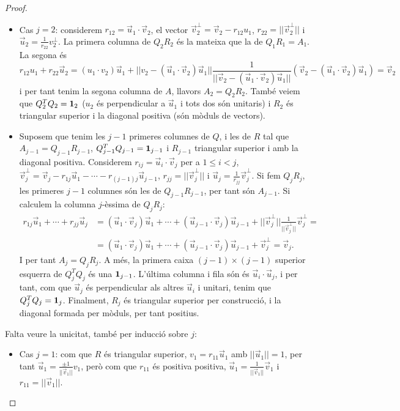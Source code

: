 \begin{proof}
\begin{itemize}
    \item Cas $j=2$: considerem $r_{12}=\vec u_1\cdot \vec v_2$, el vector $\vec v_2^\perp=\vec v_2-r_{12}u_1$, $r_{22}=||\vec v_2^\perp||$ i $\vec u_2=\frac{1}{r_{22}} v_2^\perp$. La primera columna de $Q_2R_2$ és la mateixa que la de $Q_1R_1=A_1$. La segona és
    \[
    r_{12}u_1+r_{22}\vec u_2=(u_1\cdot v_2)\vec u_1+||v_2-(\vec u_1\cdot \vec v_2)\vec u_1||\frac{1}{||\vec v_2-(\vec u_1\cdot \vec v_2)\vec u_1||}(\vec v_2-(\vec u_1\cdot \vec v_2)\vec u_1)=\vec v_2
    \]
    i per tant tenim la segona columna de $A$, llavors $A_2=Q_2R_2$. També veiem que $Q_2^TQ_2=\mathbf{1}_2$ ($u_2$ és perpendicular a $\vec u_1$ i tots dos són unitaris) i $R_2$ és triangular superior i la diagonal positiva (són mòduls de vectors).
    \item Suposem que tenim les $j-1$ primeres columnes de $Q$, i les de $R$ tal que $A_{j-1}=Q_{j-1}R_{j-1}$, $Q_{j-1}^TQ_{j-1}=\mathbf{1}_{j-1}$ i $R_{j-1}$ triangular superior i amb la diagonal positiva. Considerem $r_{ij}=\vec u_i\cdot \vec v_j$ per a $1\leq i <j$, $\vec v_j^\perp=\vec v_j-r_{1j}\vec u_1-\cdots-r_{(j-1)j}\vec u_{j-1}$, $r_{jj}=||\vec v_j^\perp||$ i $\vec u_j=\frac{1}{r_{jj}} \vec v_j^\perp$. Si fem $Q_jR_j$, les primeres $j-1$ columnes són les de $Q_{j-1}R_{j-1}$, per tant són $A_{j-1}$. Si calculem la columna $j$-èssima de $Q_jR_j$:
    \begin{align*}
     r_{1j}\vec u_1+\cdots+r_{jj}\vec u_j & =(\vec u_1\cdot \vec v_j)\vec u_1+\cdots+(\vec u_{j-1}\cdot \vec v_j)\vec u_{j-1}+||\vec v_j^\perp||\frac{1}{||\vec v_j^\perp||} \vec v_j^\perp = \\
     & =(\vec u_1\cdot \vec v_j)\vec u_1+\cdots+(\vec u_{j-1}\cdot \vec v_j)\vec u_{j-1}+ \vec v_j^\perp=\vec v_j .
    \end{align*}
    I per tant $A_j=Q_jR_j$. A més, la primera caixa $(j-1)\times(j-1)$ superior esquerra de $Q_j^TQ_j$ és una $\mathbf{1}_{j-1}$. L'última columna i fila són és $\vec u_i\cdot \vec u_j$, i per tant, com que $\vec u_j$ és perpendicular als altres $\vec u_i$ i unitari, tenim que $Q_j^TQ_j=\mathbf{1}_j$. Finalment, $R_j$ és triangular superior per construcció, i la diagonal formada per mòduls, per tant positius.
\end{itemize}
Falta veure la unicitat, també per inducció sobre $j$:
\begin{itemize}
    \item Cas $j=1$: com que $R$ és triangular superior, $v_1=r_{11}\vec u_1$ amb $||\vec u_1||=1$, per tant $\vec u_1=\frac{\pm1}{||\vec v_1||}v_1$, però com que $r_{11}$ és positiva positiva, $\vec u_1=\frac{1}{||\vec v_1||}\vec v_1$ i $r_{11}=||\vec v_1||$.

\end{itemize}
\end{proof}
